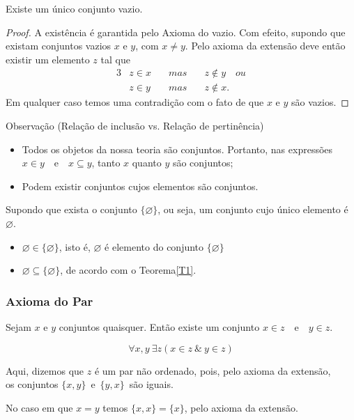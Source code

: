          \begin{theorem}\label{T2}
            Existe um único conjunto vazio.
            \begin{proof}
               A existência é garantida pelo Axioma do vazio. Com efeito, supondo que existam conjuntos vazios $x$ e $y$, com $x \neq y$. Pelo axioma da extensão deve então existir um elemento $z$ tal que
               \begin{alignat*}{3}
                  & z \in x  \quad & mas \quad & z \notin y\quad ou\\
                  & z \in y  \quad & mas \quad & z \notin x.
               \end{alignat*}
               Em qualquer caso temos uma contradição com o fato de que $x$ e $y$ são vazios.
            \end{proof}
         \end{theorem}
         \begin{mymdframed}{Observação (Relação de inclusão vs. Relação de pertinência)}
            \begin{itemize}
               \item Todos os objetos da nossa teoria são conjuntos. Portanto, nas expressões $x \in y$\ \ e\ \ $x \subseteq y$, tanto $x$ quanto $y$ são conjuntos;
               \item Podem existir conjuntos cujos elementos são conjuntos.
            \end{itemize}
            Supondo que exista o conjunto $\{\varnothing\}$, ou seja, um conjunto cujo único elemento é $\varnothing$.
            \begin{itemize}
                  \item $\varnothing \in \{\varnothing\}$, isto é, $\varnothing$ é elemento do conjunto $\{\varnothing\}$
                  \item $\varnothing \subseteq \{\varnothing\}$, de acordo com o Teorema\ref{T1}.
            \end{itemize}
         \end{mymdframed}
      
      \subsubsection{Axioma do Par}
         \begin{stat}
            Sejam $x$ e $y$ conjuntos quaisquer. Então existe um conjunto $x \in z$\ \ e\ \ $y \in z$.
         \end{stat}
         $$\forall x, y\ \exists z (x \in z\ \&\ y \in z)$$
         \begin{center}
            Aqui, dizemos que $z$ é um par não ordenado, pois, pelo axioma da extensão, \\
            os conjuntos $\{x, y\}$\ e\ $\{y, x\}$\ são iguais.
         \end{center}
         \begin{exmp}
            No caso em que $x=y$ temos $\{x, x\} = \{x\}$, pelo axioma da extensão.
         \end{exmp}

